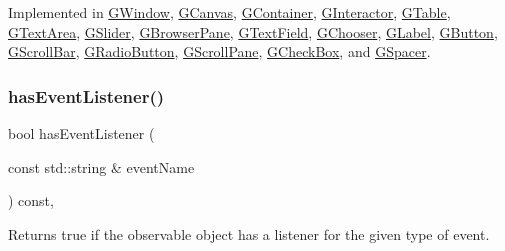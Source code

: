 Implemented in \mbox{\hyperlink{classGWindow_a9b72ede4ee8520f987a0c01e30654814}{G\+Window}}, \mbox{\hyperlink{classGCanvas_a9b72ede4ee8520f987a0c01e30654814}{G\+Canvas}}, \mbox{\hyperlink{classGContainer_a9b72ede4ee8520f987a0c01e30654814}{G\+Container}}, \mbox{\hyperlink{classGInteractor_a44c407a54a20dd0f2fff30338289299d}{G\+Interactor}}, \mbox{\hyperlink{classGTable_a9b72ede4ee8520f987a0c01e30654814}{G\+Table}}, \mbox{\hyperlink{classGTextArea_a9b72ede4ee8520f987a0c01e30654814}{G\+Text\+Area}}, \mbox{\hyperlink{classGSlider_a9b72ede4ee8520f987a0c01e30654814}{G\+Slider}}, \mbox{\hyperlink{classGBrowserPane_a9b72ede4ee8520f987a0c01e30654814}{G\+Browser\+Pane}}, \mbox{\hyperlink{classGTextField_a9b72ede4ee8520f987a0c01e30654814}{G\+Text\+Field}}, \mbox{\hyperlink{classGChooser_a9b72ede4ee8520f987a0c01e30654814}{G\+Chooser}}, \mbox{\hyperlink{classGLabel_a9b72ede4ee8520f987a0c01e30654814}{G\+Label}}, \mbox{\hyperlink{classGButton_a9b72ede4ee8520f987a0c01e30654814}{G\+Button}}, \mbox{\hyperlink{classGScrollBar_a9b72ede4ee8520f987a0c01e30654814}{G\+Scroll\+Bar}}, \mbox{\hyperlink{classGRadioButton_a9b72ede4ee8520f987a0c01e30654814}{G\+Radio\+Button}}, \mbox{\hyperlink{classGScrollPane_a9b72ede4ee8520f987a0c01e30654814}{G\+Scroll\+Pane}}, \mbox{\hyperlink{classGCheckBox_a9b72ede4ee8520f987a0c01e30654814}{G\+Check\+Box}}, and \mbox{\hyperlink{classGSpacer_a9b72ede4ee8520f987a0c01e30654814}{G\+Spacer}}.

\mbox{\label{classGObservable_a9f6faaa25942923bafa1c44020c49fa9}} 
\subsubsection{\texorpdfstring{has\+Event\+Listener()}{hasEventListener()}}
{\footnotesize\ttfamily bool has\+Event\+Listener (\begin{DoxyParamCaption}\item[{const std\+::string \&}]{event\+Name }\end{DoxyParamCaption}) const\hspace{0.3cm}{\ttfamily [protected]}, {\ttfamily [virtual]}}



Returns true if the observable object has a listener for the given type of event. 

\mbox{\label{classGObservable_aeec1adc19aa0f33de62390686ee1382c}} 
